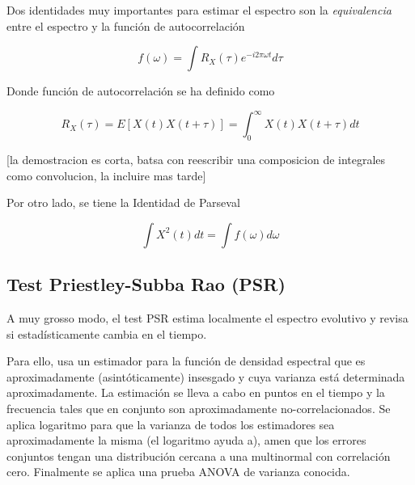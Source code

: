 Dos identidades muy importantes para estimar el espectro son la \textit{equivalencia} entre
el espectro y la funci\'on de autocorrelaci\'on

\begin{equation*}
f(\omega ) = \int R_X(\tau ) e^{-i 2\pi \omega t} d\tau
\end{equation*}

Donde funci\'on de autocorrelaci\'on se ha definido como

\begin{equation*}
R_X(\tau) = E\left[ X(t) X(t+\tau) \right] = \int_0^{\infty} X(t)X(t+\tau) dt
\end{equation*}

[la demostracion es corta, batsa con reescribir una composicion de integrales como convolucion,
la incluire mas tarde]

Por otro lado, se tiene la Identidad de Parseval

\begin{equation*}
\int X^{2}(t) dt = \int f(\omega) d\omega
\end{equation*}



\subsection{Test Priestley-Subba Rao (PSR)}


A muy grosso modo, el test PSR estima localmente  el espectro evolutivo
 y revisa si estad\'isticamente
cambia en el tiempo.

Para ello, usa un estimador para la funci\'on de densidad espectral
que es aproximadamente (asint\'oticamente) insesgado y cuya varianza est\'a
determinada aproximadamente. La estimaci\'on se lleva a cabo en puntos en el tiempo y
la frecuencia tales que en conjunto son aproximadamente no-correlacionados.
Se aplica logaritmo para que la varianza de todos los estimadores sea aproximadamente
la misma (el logaritmo ayuda a), amen que los errores conjuntos tengan una
distribuci\'on cercana a una multinormal con correlaci\'on cero.
Finalmente se aplica una prueba ANOVA de varianza conocida.

